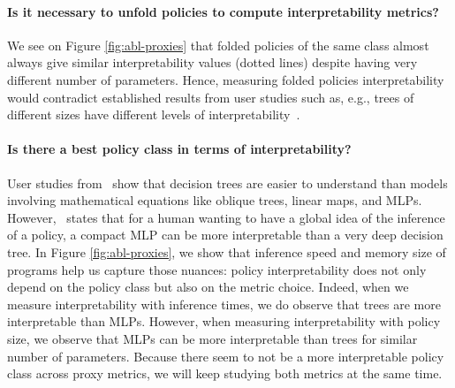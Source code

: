 \paragraph{Is it necessary to unfold policies to compute interpretability metrics?} We see on Figure \ref{fig:abl-proxies} that folded policies of the same class almost always give similar interpretability values (dotted lines) despite having very different number of parameters. Hence, measuring folded policies interpretability would contradict established results from user studies such as, e.g., trees of different sizes have different levels of interpretability~\cite{study-4}. 

\paragraph{Is there a best policy class in terms of interpretability?}
User studies from~\cite{study-1,study-2,study-3} show that decision trees are easier to understand than models involving mathematical equations like oblique trees, linear maps, and MLPs. However,~\cite{mythos} states that for a human wanting to have a global idea of the inference of a policy, a compact MLP can be more interpretable than a very deep decision tree. In Figure \ref{fig:abl-proxies}, we show that inference speed and memory size of programs help us capture those nuances: policy interpretability does not only depend on the policy class but also on the metric choice. Indeed, when we measure interpretability with inference times, we do observe that trees are more interpretable than MLPs. However, when measuring interpretability with policy size, we observe that MLPs can be more interpretable than trees for similar number of parameters. Because there seem to not be a more interpretable policy class across proxy metrics, we will keep studying both metrics at the same time.
